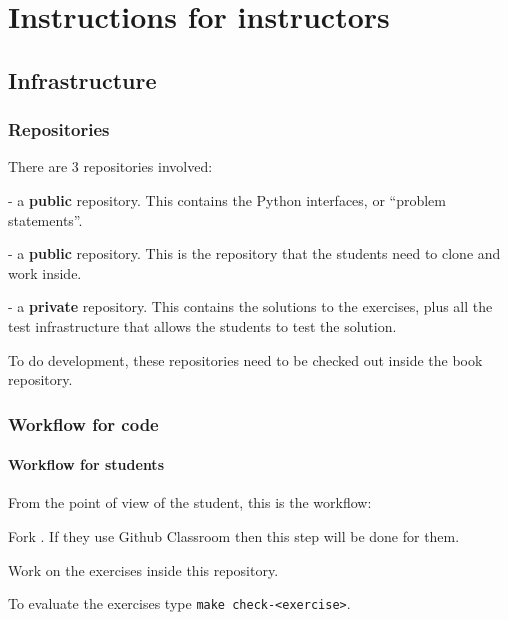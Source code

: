 \chapter{Instructions for instructors}


\section{Infrastructure}

\subsection{Repositories}
There are 3 repositories involved:
\begin{compactenum}
  \item {} - a \textbf{public} repository.
  This contains the Python interfaces, or ``problem statements''.
  \item {} - a \textbf{public} repository.
  This is the repository that the students need to clone and work inside.
  \item {} - a \textbf{private} repository.
  This contains the solutions to the exercises, plus all the test infrastructure that allows
  the students to test the solution.
\end{compactenum}

To do development, these repositories need to be checked out inside the book repository.

\subsection{Workflow for code}

\subsubsection{Workflow for students}

From the point of view of the student, this is the workflow:

\begin{compactenum}
  \item Fork . If they use Github Classroom
  then this step will be done for them.
  \item Work on the exercises inside this repository.
  \item To evaluate the exercises type \texttt{make check-<exercise>}.
\end{compactenum}

